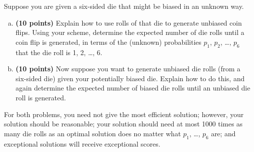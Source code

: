 \documentclass[11pt, letterpaper]{article}
\begin{document}
\pagebreak
\begin{problem}
Suppose you are given a six-sided die that might be biased in an unknown way.
\begin{enumerate}[(a)]
        \item {\bf (10 points)}
        Explain how to use rolls of that die to generate unbiased coin flips. Using your scheme, determine
        the expected number of die rolls until a coin flip is generated, in terms of the (unknown) probabilities $p_1$, $p_2$, \ldots, $p_6$ that the die roll is 1, 2, \ldots, 6.
        \item {\bf (10 points)}
        Now suppose you want to generate unbiased die rolls (from a six-sided die) given
        your potentially biased die. Explain how to do this, and again determine the expected number of
        biased die rolls until an unbiased die roll is generated.
        \end{enumerate}

For both problems, you need not give the
most efficient solution; however, your solution should be reasonable; your solution should need at most 1000 times as many die rolls as an optimal solution does no matter what $p_1$, \ldots, $p_6$ are; and exceptional solutions will
receive exceptional scores.
\end{problem}
\end{document}
